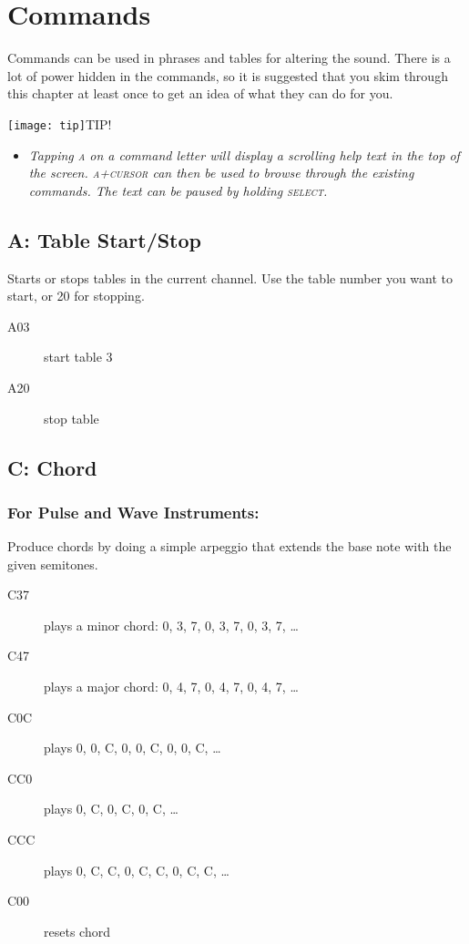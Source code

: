 \chapter{Commands}

Commands can be used in phrases and tables for altering the sound. There is a lot of power hidden in the commands, so it is suggested that you skim through this chapter at least once to get an idea of what they can do for you.

\texttt{[image: tip]}TIP!
\begin{itemize}
        \item \textit{Tapping \textsc{a} on a command letter will display a scrolling help text in the top of the screen. \textsc{a+cursor} can then be used to browse through the existing commands. The text can be paused by holding \textsc{select}.}
	\end{itemize}

\section{A: Table Start/Stop}

Starts or stops tables in the current channel. Use the table number you want to start, or 20 for stopping.

\begin{description}
\item[A03] start table 3
\item[A20] stop table
\end{description}

\section{C: Chord}

\subsection{For Pulse and Wave Instruments:}

\label{command-chord}
Produce chords by doing a simple arpeggio that extends the base note with the given semitones.

\begin{description}
\item[C37] plays a minor chord: 0, 3, 7, 0, 3, 7, 0, 3, 7, \ldots
\item[C47] plays a major chord: 0, 4, 7, 0, 4, 7, 0, 4, 7, \ldots
\item[C0C] plays 0, 0, C, 0, 0, C, 0, 0, C, \ldots
\item[CC0] plays 0, C, 0, C, 0, C, \ldots
\item[CCC] plays 0, C, C, 0, C, C, 0, C, C, \ldots
\item[C00] resets chord
\end{description}

